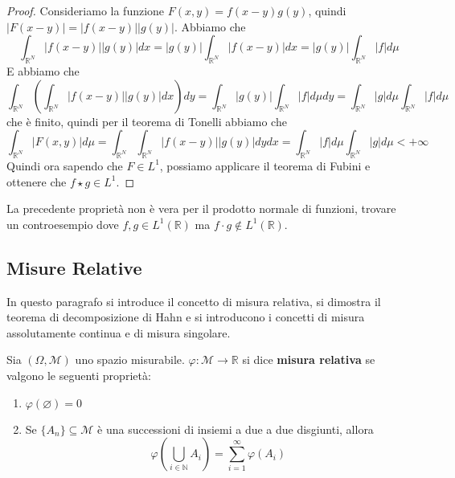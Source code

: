 \begin{proof}
    Consideriamo la funzione \(F(x, y) = f(x-y) g(y)\), quindi
    \(|F(x-y)| = |f(x-y)||g(y)|\). Abbiamo che
    \[
\int_{\mathbb{R}^{N}}
        |f(x-y)||g(y)| dx = |g(y)| \int_{\mathbb{R}^{N}} |f(x-y)| dx = |g(y)|
        \int_{\mathbb{R}^{N}} |f| d\mu
    \]
    E abbiamo che
    \[
        \int_{\mathbb{R}^{N}} {\left( \int_{\mathbb{R}^{N}} |f(x-y)| |g(y)| dx
        \right)} dy = \int_{\mathbb{R}^{N}} |g(y)| \int_{\mathbb{R}^{N}} |f|
        d\mu dy = \int_{\mathbb{R}^{N}} |g| d\mu \int_{\mathbb{R}^{N}} |f| d\mu
    \]
    che è finito, quindi per il teorema di Tonelli abbiamo che
    \[
        \int_{\mathbb{R}^{N}} |F(x, y)| d\mu =
         \int_{\mathbb{R}^{N}}
        \int_{\mathbb{R}^{N}} |f(x-y)||g(y)| dy dx =
        \int_{\mathbb{R}^{N}}|f|d\mu \int_{\mathbb{R}^{N}} |g|d\mu < +\infty    
    \]
    Quindi ora sapendo che \(F \in L^{1}\), possiamo applicare il teorema di
    Fubini e ottenere che \(f \star g \in L^{1}\).
\end{proof}
\begin{eser}
    La precedente proprietà non è vera per il prodotto normale di funzioni,
    trovare un controesempio dove \(f, g \in L^{1}(\mathbb{R})\) ma \(f \cdot g
    \not\in L^{1}(\mathbb{R})\).
\end{eser}

\newpage
\subsection{Misure Relative}
In questo paragrafo si introduce il concetto di misura relativa, si dimostra il
teorema di decomposizione di Hahn e si introducono i concetti di misura
assolutamente continua e di misura singolare.
\begin{definition}
Sia \((\Omega, \mathcal{M})\) uno spazio misurabile. \(\varphi: \mathcal{M} \to
\mathbb{R}\) si dice \textbf{misura relativa} se valgono le seguenti proprietà:
\begin{enumerate}[label = \arabic*.]
    \item \(\varphi(\varnothing) = 0\)  
    \item Se \(\{A_{n}\} \subseteq\mathcal{M} \) è una successioni di insiemi a
        due a due disgiunti, allora
        \[
            \varphi\left( \bigcup_{i \in \mathbb{N}} A_{i} \right) =
            \sum_{i=1}^{\infty} \varphi(A_{i}) 
        \]
\end{enumerate}
\end{definition}

